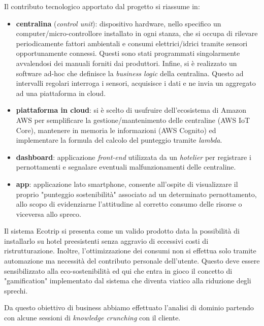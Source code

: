 Il contributo tecnologico apportato dal progetto si riassume in:
\begin{itemize}
    \item \textbf{centralina} (\textit{control unit}): dispositivo hardware, nello specifico un computer/micro-controllore installato in ogni stanza, che si occupa di rilevare periodicamente fattori ambientali e consumi elettrici/idrici tramite sensori opportunamente connessi. Questi sono stati programmati singolarmente avvalendosi dei manuali forniti dai produttori. Infine, si è realizzato un software ad-hoc che definisce la \textit{business logic} della centralina. Questo ad intervalli regolari interroga i sensori, acquisisce i dati e ne invia un aggregato ad una piattaforma in cloud. 
    \item \textbf{piattaforma in cloud}: si è scelto di usufruire dell'ecosistema di Amazon AWS per semplificare la gestione/mantenimento delle centraline (AWS IoT Core), mantenere in memoria le informazioni (AWS Cognito) ed implementare la formula del calcolo del punteggio tramite \textit{lambda}.
    \item \textbf{dashboard}: applicazione \textit{front-end} utilizzata da un \textit{hotelier} per registrare i pernottamenti e segnalare eventuali malfunzionamenti delle centraline.
    \item \textbf{app}: applicazione lato smartphone, consente all'ospite di visualizzare il proprio "punteggio sostenibilità" associato ad un determinato pernottamento, allo scopo di evidenziarne l'attitudine al corretto consumo delle risorse o viceversa allo spreco.
\end{itemize}
Il sistema Ecotrip si presenta come un valido prodotto data la possibilità di installarlo su hotel preesistenti senza aggravio di eccessivi costi di ristrutturazione. Inoltre, l'ottimizzazione dei consumi non si effettua solo tramite automazione ma necessità del contributo personale dell'utente. Questo deve essere sensibilizzato alla eco-sostenibilità ed qui che entra in gioco il concetto di "gamification" implementato dal sistema che diventa viatico alla riduzione degli sprechi.

Da questo obiettivo di business abbiamo effettuato l'analisi di dominio partendo con alcune sessioni di \textit{knowledge crunching} con il cliente.

\newpage